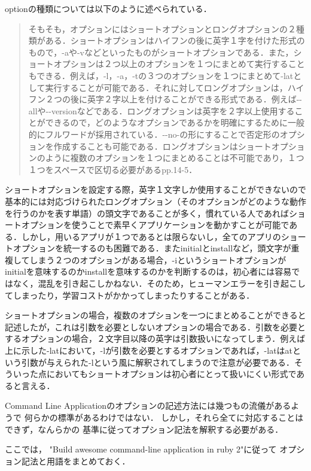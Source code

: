 optionの種類については以下のように述べられている．

\begin{quote}
そもそも，オプションにはショートオプションとロングオプションの２種類がある．ショートオプションはハイフンの後に英字１字を付けた形式のもので，-aや-vなどといったものがショートオプションである．また，ショートオプションは２つ以上のオプションを１つにまとめて実行することもできる．例えば，-l，-a，-tの３つのオプションを１つにまとめて-latとして実行することが可能である．それに対してロングオプションは，ハイフン２つの後に英字２字以上を付けることができる形式である．例えば-\/-allや-\/-versionなどである．ロングオプションは英字を２字以上使用することができるので，どのようなオプションであるかを明確にするために一般的にフルワードが採用されている．-\/-no-の形にすることで否定形のオプションを作成することも可能である．ロングオプションはショートオプションのように複数のオプションを１つにまとめることは不可能であり，１つ１つをスペースで区切る必要がある\cite{awesome}pp.14-5．
\end{quote}

ショートオプションを設定する際，英字１文字しか使用することができないので基本的には対応づけられたロングオプション（そのオプションがどのような動作を行うのかを表す単語）の頭文字であることが多く，慣れている人であればショートオプションを使うことで素早くアプリケーションを動かすことが可能である．しかし，用いるアプリが１つであるとは限らないし，全てのアプリのショートオプションを統一するのも困難である．またinitialとinstallなど，頭文字が重複してしまう２つのオプションがある場合，-iというショートオプションがinitialを意味するのかinstallを意味するのかを判断するのは，初心者には容易ではなく，混乱を引き起こしかねない．そのため，ヒューマンエラーを引き起こしてしまったり，学習コストがかかってしまったりすることがある．

ショートオプションの場合，複数のオプションを一つにまとめることができると記述したが，これは引数を必要としないオプションの場合である．引数を必要とするオプションの場合，２文字目以降の英字は引数扱いになってしまう．例えば上に示した-latにおいて，-lが引数を必要とするオプションであれば，-latはatという引数が与えられた-lという風に解釈されてしまうので注意が必要である．そういった点においてもショートオプションは初心者にとって扱いにくい形式であると言える．

Command Line Applicationのオプションの記述方法には幾つもの流儀があるようで
何らかの標準があるわけではない．
しかし，それら全てに対応することはできず，なんらかの
基準に従ってオプション記法を解釈する必要がある．

ここでは， "Build awesome command-line application in ruby 2"に従って
オプション記法と用語をまとめておく．

